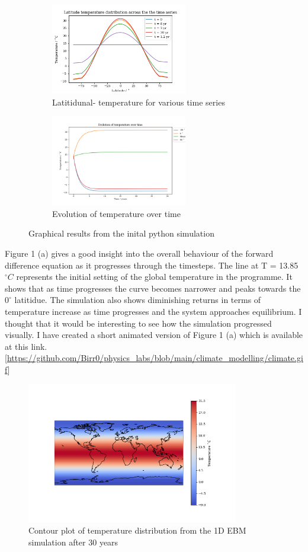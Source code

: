 \documentclass{article}%
\begin{document}
\begin{figure}[H]%
  \centering%
  \begin{subfigure}{0.4\textwidth}
    \includegraphics[width=225px]{multi-time-temp-distribution.png}%
    \caption{Latitidunal- temperature for various time series }%
  \end{subfigure}
  \begin{subfigure}{0.4\textwidth}
    \includegraphics[width=225px]{temperature-evolution.png}%
    \caption{Evolution of temperature over time}%
  \end{subfigure}
  \caption{Graphical results from the inital python simulation}
\end{figure}

Figure 1 (a) gives a good insight into the overall behaviour of the forward difference equation as it progresses through the timesteps.
The line at T = 13.85$^\circ C$ represents the initial setting of the global temperature in the programme.
It shows that as time progresses the curve becomes narrower and peaks towards the $0 ^\circ $ latitidue. 
The simulation also shows diminishing returns in terms of temperature increase as time progresses and the system approaches equilibrium.
I thought that it would be interesting to see how the simulation progressed visually. I have created a short animated version of Figure 1 (a) which is available at this link. [\url{https://github.com/Birr0/physics_labs/blob/main/climate_modelling/climate.gif}]

\begin{figure}[H]%
  \centering%
  \includegraphics[width=350px]{global-temp-distribution.png}
  \caption{Contour plot of temperature distribution from the 1D EBM simulation after 30 years}
\end{figure}
\end{document}
